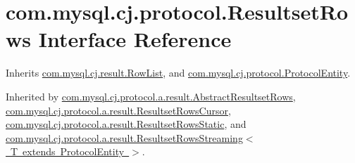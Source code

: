 \hypertarget{interfacecom_1_1mysql_1_1cj_1_1protocol_1_1_resultset_rows}{}\section{com.\+mysql.\+cj.\+protocol.\+Resultset\+Rows Interface Reference}
\label{interfacecom_1_1mysql_1_1cj_1_1protocol_1_1_resultset_rows}


Inherits \mbox{\hyperlink{interfacecom_1_1mysql_1_1cj_1_1result_1_1_row_list}{com.\+mysql.\+cj.\+result.\+Row\+List}}, and \mbox{\hyperlink{interfacecom_1_1mysql_1_1cj_1_1protocol_1_1_protocol_entity}{com.\+mysql.\+cj.\+protocol.\+Protocol\+Entity}}.



Inherited by \mbox{\hyperlink{classcom_1_1mysql_1_1cj_1_1protocol_1_1a_1_1result_1_1_abstract_resultset_rows}{com.\+mysql.\+cj.\+protocol.\+a.\+result.\+Abstract\+Resultset\+Rows}}, \mbox{\hyperlink{classcom_1_1mysql_1_1cj_1_1protocol_1_1a_1_1result_1_1_resultset_rows_cursor}{com.\+mysql.\+cj.\+protocol.\+a.\+result.\+Resultset\+Rows\+Cursor}}, \mbox{\hyperlink{classcom_1_1mysql_1_1cj_1_1protocol_1_1a_1_1result_1_1_resultset_rows_static}{com.\+mysql.\+cj.\+protocol.\+a.\+result.\+Resultset\+Rows\+Static}}, and \mbox{\hyperlink{classcom_1_1mysql_1_1cj_1_1protocol_1_1a_1_1result_1_1_resultset_rows_streaming}{com.\+mysql.\+cj.\+protocol.\+a.\+result.\+Resultset\+Rows\+Streaming$<$ T extends Protocol\+Entity $>$}}.

